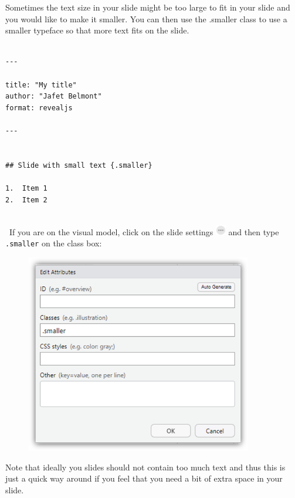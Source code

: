 \documentclass[
  letterpaper,
  DIV=11,
  numbers=noendperiod]{scrartcl}
\begin{document}
Sometimes the text size in your slide might be too large to fit in your
slide and you would like to make it smaller. You can then use the
.smaller class to use a smaller typeface so that more text fits on the
slide.

\begin{verbatim}

---

title: "My title"
author: "Jafet Belmont"
format: revealjs

---


## Slide with small text {.smaller}

1.  Item 1
2.  Item 2
 
\end{verbatim}

~If you are on the visual model, click on the slide settings
\includegraphics[width=0.17708in,height=\textheight]{images/threedots.png}
and then type \texttt{.smaller} on the class box:

\begin{figure}

{\centering \includegraphics[width=3.88542in,height=\textheight]{images/quarto14.png}

}

\end{figure}

\begin{tcolorbox}[enhanced jigsaw, colback=white, toprule=.15mm, arc=.35mm, colbacktitle=quarto-callout-note-color!10!white, titlerule=0mm, colframe=quarto-callout-note-color-frame, title=\textcolor{quarto-callout-note-color}{\faInfo}\hspace{0.5em}{Note}, bottomtitle=1mm, toptitle=1mm, coltitle=black, rightrule=.15mm, opacityback=0, bottomrule=.15mm, breakable, leftrule=.75mm, left=2mm, opacitybacktitle=0.6]

Note that ideally you slides should not contain too much text and thus
this is just a quick way around if you feel that you need a bit of extra
space in your slide.

\end{tcolorbox}
\end{document}
